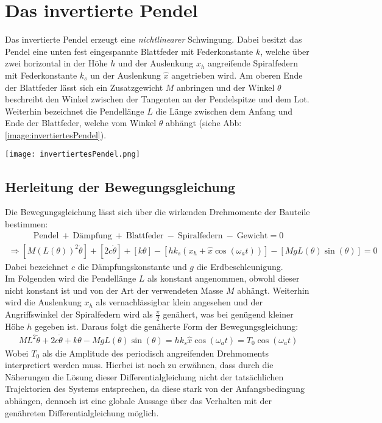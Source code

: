 

\section{Das invertierte Pendel}
\label{sec:invertPendel}
Das invertierte Pendel erzeugt eine \textit{nichtlinearer} Schwingung. Dabei besitzt das Pendel eine unten fest eingespannte Blattfeder mit Federkonstante $k$, welche über zwei horizontal in der Höhe $h$ und der Auslenkung $x_h$ angreifende Spiralfedern mit Federkonstante $k_s$ un der Auslenkung $\hat{x}$ angetrieben wird. Am oberen Ende der Blattfeder lässt sich ein Zusatzgewicht $M$ anbringen und der Winkel $\theta$ beschreibt den Winkel zwischen der Tangenten an der Pendelspitze und dem Lot. Weiterhin bezeichnet die Pendellänge $L$ die Länge zwischen dem Anfang und Ende der Blattfeder, welche vom Winkel $\theta$ abhängt (siehe Abb: \ref{image:invertiertesPendel}).
\begin{center}
    \texttt{[image: invertiertesPendel.png]}
    \label{image:invertiertesPendel}
\end{center}
\subsection{Herleitung der Bewegungsgleichung}
\label{sub:bewegungsgleichung}
Die Bewegungsgleichung lässt sich über die wirkenden Drehmomente der Bauteile bestimmen:
\begin{gather*}
        \text{Pendel}~+~\text{Dämpfung}~+~\text{Blattfeder}~-~\text{Spiralfedern}~-~\text{Gewicht} = 0
\end{gather*}
\begin{gather}
    \Rightarrow [M(L(\theta))^2\ddot{\theta}]+[2c\dot{\theta}]+[k\theta]-[hk_s(x_h+\hat{x}\cos(\omega_at))]-[MgL(\theta)\sin(\theta)]=0
\end{gather}
Dabei bezeichnet $c$ die Dämpfungskonstante und $g$ die Erdbeschleunigung.\\
Im Folgenden wird die Pendellänge $L$ als konstant angenommen, obwohl dieser nicht konstant ist und von der Art der verwendeten Masse $M$ abhängt. Weiterhin wird die Auslenkung $x_h$ als vernachlässigbar klein angesehen und der Angriffswinkel der Spiralfedern wird als $\frac{\pi}{2}$ genähert, was bei genügend kleiner Höhe $h$ gegeben ist.
Daraus folgt die genäherte Form der Bewegungsgleichung:
\begin{gather}
    ML^2\ddot{\theta}+2c\dot{\theta}+k\theta-MgL(\theta)\sin(\theta)=hk_s\hat{x}\cos(\omega_at)=T_0\cos(\omega_at)
\end{gather}
Wobei $T_0$ als die Amplitude des periodisch angreifenden Drehmoments interpretiert werden muss. Hierbei ist noch zu erwähnen, dass durch die Näherungen die Lösung dieser Differentialgleichung nicht der tatsächlichen Trajektorien des Systems entsprechen, da diese stark von der Anfangsbedingung abhängen, dennoch ist eine globale Aussage über das Verhalten mit der genähreten Differentialgleichung möglich. \citep{Lueck}

